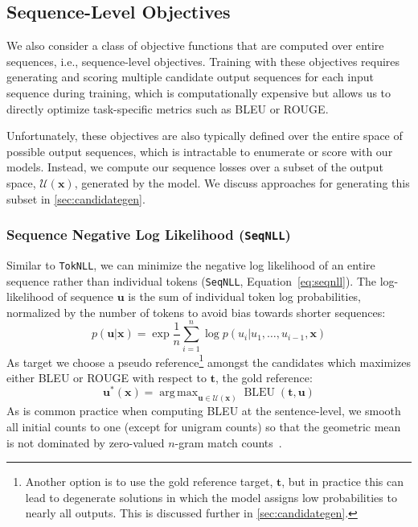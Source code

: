 \documentclass[11pt,a4paper]{article}
\newcommand{\source}{\mathbf{x}}
\newcommand{\pseudoreference}{\mathbf{u}^*}
\newcommand{\goldreference}{\mathbf{t}}
\newcommand{\candhypos}{\mathcal{U}}
\newcommand{\candhypo}{\mathbf{u}}
\newcommand{\candhypotok}{u}
\newcommand{\TokNLL}{\texttt{TokNLL}}
\newcommand{\SeqNLL}{\texttt{SeqNLL}}
\DeclareMathOperator*{\argmax}{arg\,max}
\begin{document}
\subsection{Sequence-Level Objectives}
\label{sec:seqobj}

We also consider a class of objective functions that are computed over entire sequences, i.e., sequence-level objectives.
Training with these objectives requires generating and scoring multiple candidate output sequences for each input sequence during training, which is computationally expensive but allows us to directly optimize task-specific metrics such as BLEU or ROUGE.

Unfortunately, these objectives are also typically defined over the entire space of possible output sequences, which is intractable to enumerate or score with our models.
Instead, we compute our sequence losses over a subset of the output space, $\candhypos(\source)$, generated by the model.
We discuss approaches for generating this subset in \textsection\ref{sec:candidategen}.

\subsubsection*{Sequence Negative Log Likelihood (\SeqNLL)}
\label{sec:seqnll}

Similar to \TokNLL, we can minimize the negative log likelihood of an entire sequence rather than individual tokens (\SeqNLL, Equation~\ref{eq:seqnll}).
The log-likelihood of sequence $\candhypo$ is the sum of individual token log probabilities, normalized by the number of tokens to avoid bias towards shorter sequences:
$$p(\candhypo|\source) = \exp \frac{1}{n}\sum_{i=1}^n \log p(\candhypotok_i|\candhypotok_1,\dots,\candhypotok_{i-1}, \source)$$
As target we choose a pseudo reference\footnote{Another option is to use the gold reference target, $\goldreference$, but in practice this can lead to degenerate solutions in which the model assigns low probabilities to nearly all outputs. This is discussed further in \textsection\ref{sec:candidategen}.
} amongst the candidates which maximizes either
BLEU or ROUGE with respect to $\goldreference$, the gold reference:
\[ \pseudoreference(\source) = \argmax_{\candhypo \in \candhypos(\source)} \operatorname{BLEU}(\goldreference, \candhypo) \]
As is common practice when computing BLEU at the sentence-level, we smooth all initial counts to one (except for unigram counts) so that the geometric mean is not dominated by zero-valued $n$-gram match counts~\citep{lin2004orange}.
\end{document}
